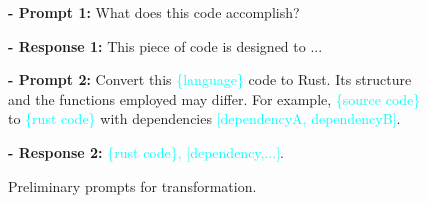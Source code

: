 \begin{figure}[ht]
  \centering
\begin{tcolorbox}[colframe=gray!50!white, 
 colback=white, 
 coltitle=black, 
 fonttitle=\bfseries, 
 left=1mm, 
 right=1mm]

\footnotesize
\textbf{- \textcolor{green!60!black}{Prompt 1:}} What does this code accomplish?

\textbf{- \textcolor{red!80!black}{Response 1:}} This piece of code is designed to ...

\medskip

\textbf{- \textcolor{green!60!black}{Prompt 2:}} Convert this \textcolor{cyan}{\{language\}} code to Rust. Its structure and the functions employed may differ.
For example, \textcolor{cyan}{\{source code\}} to \textcolor{cyan}{\{rust code\}} with dependencies \textcolor{cyan}{[dependencyA, dependencyB]}. 

\textbf{- \textcolor{red!80!black}{Response 2:}} \textcolor{cyan}{\{rust code\}, [dependency,...]}.

\end{tcolorbox}
\caption{Preliminary prompts for transformation.}
\label{box:build_prompt}
\end{figure}